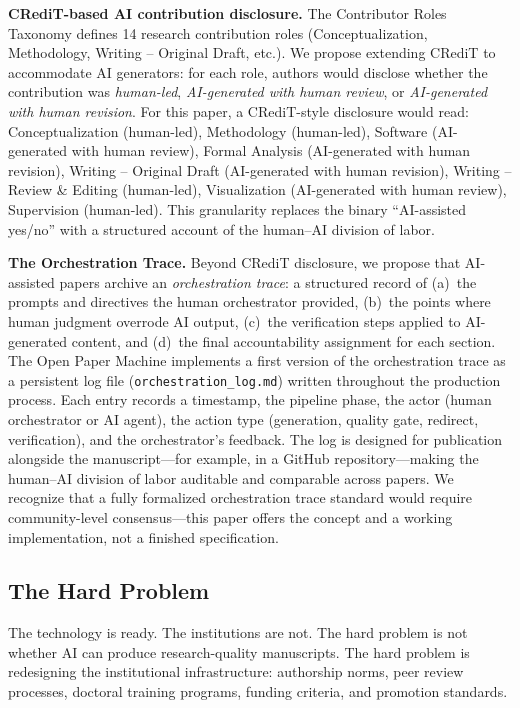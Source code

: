 \documentclass{article}
\begin{document}
\textbf{CRediT-based AI contribution disclosure.} The Contributor Roles Taxonomy \citep{brand2015credit} defines 14 research contribution roles (Conceptualization, Methodology, Writing -- Original Draft, etc.). We propose extending CRediT to accommodate AI generators: for each role, authors would disclose whether the contribution was \textit{human-led}, \textit{AI-generated with human review}, or \textit{AI-generated with human revision}. For this paper, a CRediT-style disclosure would read: Conceptualization (human-led), Methodology (human-led), Software (AI-generated with human review), Formal Analysis (AI-generated with human revision), Writing -- Original Draft (AI-generated with human revision), Writing -- Review \& Editing (human-led), Visualization (AI-generated with human review), Supervision (human-led). This granularity replaces the binary ``AI-assisted yes/no'' with a structured account of the human--AI division of labor.

\textbf{The Orchestration Trace.} Beyond CRediT disclosure, we propose that AI-assisted papers archive an \textit{orchestration trace}: a structured record of (a)~the prompts and directives the human orchestrator provided, (b)~the points where human judgment overrode AI output, (c)~the verification steps applied to AI-generated content, and (d)~the final accountability assignment for each section. The Open Paper Machine implements a first version of the orchestration trace as a persistent log file (\texttt{orchestration\_log.md}) written throughout the production process. Each entry records a timestamp, the pipeline phase, the actor (human orchestrator or AI agent), the action type (generation, quality gate, redirect, verification), and the orchestrator's feedback. The log is designed for publication alongside the manuscript---for example, in a GitHub repository---making the human--AI division of labor auditable and comparable across papers. We recognize that a fully formalized orchestration trace standard would require community-level consensus---this paper offers the concept and a working implementation, not a finished specification.


\subsection{The Hard Problem}

The technology is ready. The institutions are not. The hard problem is not whether AI can produce research-quality manuscripts.
The hard problem is redesigning the institutional infrastructure: authorship norms, peer review processes, doctoral training programs, funding criteria, and promotion standards.
\end{document}
